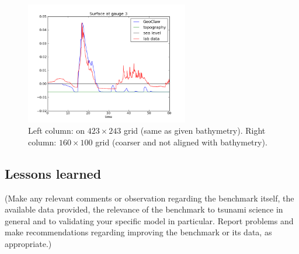 \begin{figure}[ht]
\hfil\includegraphics[width=2.8in]{bp7/figs160/gauge0003fig300.png}\hfil
\caption{\label{fig:bp7gauges} 
Left column: on $423\times 243$ grid (same as given bathymetry).
Right column: $160\times 100$ grid (coarser and not aligned with
bathymetry).
  }
\end{figure}

\subsection{Lessons learned}

(Make any relevant comments or observation regarding the benchmark itself,
the available data provided, the relevance of the benchmark to tsunami
science in general and to validating your specific model in particular. 
Report problems and make recommendations regarding improving the benchmark
or its data, as appropriate.)


